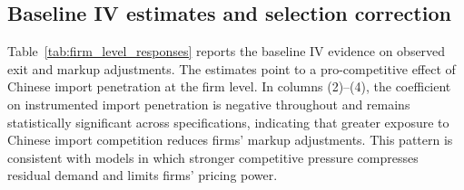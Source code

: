 \documentclass[12pt]{article}
\begin{document}
\subsection{Baseline IV estimates and selection correction}
    
Table~\ref{tab:firm_level_responses} reports the baseline IV evidence on observed exit and markup adjustments. The estimates point to a pro-competitive effect of Chinese import penetration at the firm level. In columns (2)--(4), the coefficient on instrumented import penetration is negative throughout and remains statistically significant across specifications, indicating that greater exposure to Chinese import competition reduces firms' markup adjustments. This pattern is consistent with models in which stronger competitive pressure compresses residual demand and limits firms' pricing power.
\end{document}
